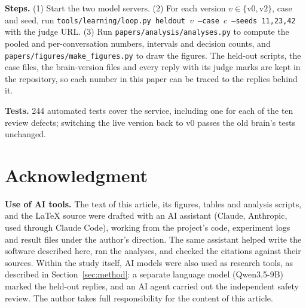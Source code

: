 \documentclass[journal]{IEEEtran}
\begin{document}
\textbf{Steps.} (1) Start the two model servers. (2) For each version $v\in\{\text{v0},\text{v2}\}$, case and seed, run
\texttt{tools/learning/loop.py heldout $v$ --case $c$ --seeds 11,23,42} with the judge URL. (3) Run \texttt{papers/analysis/analyses.py} to
compute the pooled and per-conversation numbers, intervals and decision counts, and \texttt{papers/figures/make\_figures.py} to draw the
figures. The held-out scripts, the case files, the brain-version files and every reply with its judge marks are kept in the repository, so
each number in this paper can be traced to the replies behind it.

\textbf{Tests.} 244 automated tests cover the service, including one for each of the ten review defects; switching the live version back to v0
passes the old brain's tests unchanged.

\section*{Acknowledgment}
\textbf{Use of AI tools.} The text of this article, its figures, tables and analysis scripts, and the \LaTeX{} source were
drafted with an AI assistant (Claude, Anthropic, used through Claude Code), working from the project's code, experiment logs and result
files under the author's direction. The same assistant helped write the software described here, ran the analyses, and checked the
citations against their sources. Within the study itself, AI models were also used as research tools, as described in Section~\ref{sec:method}: a separate language model (Qwen3.5-9B) marked the held-out replies, and an AI agent carried out the independent safety review. The author takes full responsibility for the content of this article.



\end{document}
